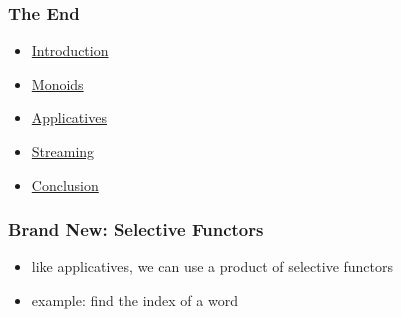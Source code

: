 \documentclass[aspectratio=169]{beamer}
\begin{document}
\begin{frame}
  \frametitle{The End}
  \begin{itemize}
  \item \hyperref[sec:introduction]{Introduction}
  \item \hyperref[sec:monoids]{Monoids}
  \item \hyperref[sec:applicatives]{Applicatives}
  \item \hyperref[sec:streaming]{Streaming}
  \item \hyperref[sec:conclusion]{Conclusion}
  \end{itemize}
\end{frame}

\appendix{}

\begin{frame}
  \frametitle{Brand New: Selective Functors}
  \begin{itemize}
  \item like applicatives, we can use a product of selective functors
  \item example: find the index of a word
  \end{itemize}
\end{frame}
\end{document}

